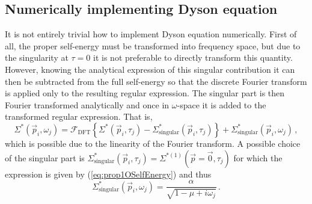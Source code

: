 \subsection{Numerically implementing Dyson equation}
\label{sec:DysonImplementation}

It is not entirely trivial how to implement Dyson equation numerically. First of all, the proper self-energy must be transformed into frequency space, but due to the singularity at $ \tau = 0 $ it is not preferable to directly transform this quantity. However, knowing the analytical expression of this singular contribution it can then be subtracted from the full self-energy so that the discrete Fourier transform is applied only to the resulting regular expression. The singular part is then Fourier transformed analytically and once in $ \omega $-space it is added to the transformed regular expression. That is,
\begin{equation}
	\Sigma^{*}(\vec p_i, \omega_j)
	= \mathcal{F}_\text{DFT} \left\{ \Sigma^{*}(\vec p_i, \tau_j) - \Sigma^{*}_\text{singular}(\vec p_i, \tau_j) \right\}
	+ \Sigma^{*}_\text{singular}(\vec p_i, \omega_j) \,,
\end{equation}
which is possible due to the linearity of the Fourier transform. A possible choice of the singular part is $ \Sigma^{*}_\text{singular}(\vec p_i, \tau_j) = \Sigma^{*(1)}(\vec p = \vec 0, \tau_j) $ for which the expression is given by (\ref{eq:prop1OSelfEnergy}) and thus
\begin{equation}
	\Sigma^{*}_\text{singular}(\vec p_i, \omega_j) = \frac{\alpha}{\sqrt{1 - \mu + i\omega_j}} \,.
\end{equation}

